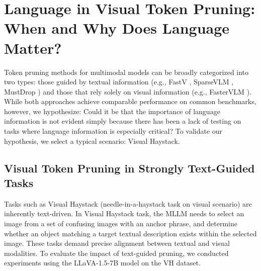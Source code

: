 \section{Language in  Visual Token Pruning: When and Why Does Language Matter?}



Token pruning methods for multimodal models can be broadly categorized into two types: those guided by textual information (e.g., FastV \cite{chen2024image}, SparseVLM \cite{zhang2024sparsevlm}, MustDrop \cite{liu2024multi}) and those that rely solely on visual information (e.g., FasterVLM \cite{zhang2024clsattentionneedtrainingfree}). While both approaches achieve comparable performance on common benchmarks, however, we hypothesize: Could it be that the importance of language information is not evident simply because there has been a lack of testing on tasks where language information is especially critical? To validate our hypothesis, we select a typical scenario: Visual Haystack.


\subsection{Visual Token Pruning in Strongly Text-Guided Tasks}



Tasks such as Visual Haystack \citep{wu2025visual} (needle-in-a-haystack task on visual scenario) are inherently text-driven. In Visual Haystack task, the MLLM needs to select an image from a set of confusing images with an anchor phrase, and determine whether an object matching a target textual description exists within the selected image. These tasks demand precise alignment between textual and visual modalities. To evaluate the impact of text-guided pruning, we conducted experiments using the LLaVA-1.5-7B model on the VH dataset.

